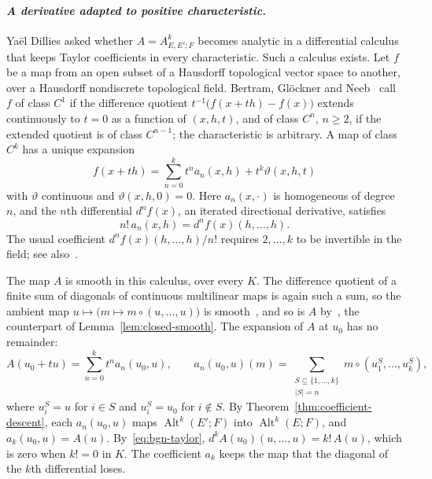 \documentclass[11pt]{amsart}
\theoremstyle{definition}
\theoremstyle{remark}
\numberwithin{equation}{section}
\newcommand{\Alt}{\operatorname{Alt}}
\newcommand{\abs}[1]{\lvert #1\rvert}
\begin{document}
\paragraph{\textit{A derivative adapted to positive characteristic.}}
Ya\"el Dillies asked whether $A=A^k_{E,E';F}$ becomes analytic in a differential calculus that keeps Taylor coefficients in every
characteristic. Such a calculus exists. Let $f$ be a map from an open subset of a Hausdorff topological vector space to
another, over a Hausdorff nondiscrete topological field. Bertram, Gl\"ockner and Neeb~\cite{BGN} call $f$ of class $C^1$
if the difference quotient $t^{-1}\bigl(f(x+th)-f(x)\bigr)$ extends continuously to $t=0$ as a function of $(x,h,t)$, and of
class $C^n$, $n\ge2$, if the extended quotient is of class $C^{n-1}$; the characteristic is arbitrary. A map of class $C^k$
has a unique expansion~\cite[Theorem~5.1]{BGN}
\[
 f(x+th)=\sum_{n=0}^{k}t^n a_n(x,h)+t^k\vartheta(x,h,t)
\]
with $\vartheta$ continuous and $\vartheta(x,h,0)=0$. Here $a_n(x,\cdot)$ is homogeneous of degree $n$, and the $n$th
differential $d^nf(x)$, an iterated directional derivative, satisfies~\cite[Definition~4.7 and Theorem~5.4]{BGN}
\begin{equation}\label{eq:bgn-taylor}
 n!\,a_n(x,h)=d^nf(x)(h,\ldots,h).
\end{equation}
The usual coefficient $d^nf(x)(h,\ldots,h)/n!$ requires $2,\ldots,k$ to be invertible in the field; see
also~\cite[Chapter~1]{Be}.

The map $A$ is smooth in this calculus, over every $K$. The difference quotient of a finite sum of diagonals of
continuous multilinear maps is again such a sum, so the ambient map $u\mapsto\bigl(m\mapsto m\circ(u,\ldots,u)\bigr)$ is
smooth~\cite[3.4 and Remark~4.2]{BGN}, and so is $A$ by~\cite[Lemma~10.1]{BGN}, the counterpart of
Lemma~\ref{lem:closed-smooth}. The expansion of $A$ at $u_0$ has no remainder:
\[
 A(u_0+tu)=\sum_{n=0}^{k}t^n a_n(u_0,u),\qquad
 a_n(u_0,u)(m)=\sum_{\substack{S\subseteq\{1,\ldots,k\}\\ \abs S=n}}m\circ(u^S_1,\ldots,u^S_k),
\]
where $u^S_i=u$ for $i\in S$ and $u^S_i=u_0$ for $i\notin S$. By Theorem~\ref{thm:coefficient-descent}, each
$a_n(u_0,u)$ maps $\Alt^k(E';F)$ into $\Alt^k(E;F)$, and $a_k(u_0,u)=A(u)$. By~\eqref{eq:bgn-taylor},
$d^kA(u_0)(u,\ldots,u)=k!\,A(u)$, which is zero when $k!=0$ in $K$. The coefficient $a_k$ keeps the map that the diagonal
of the $k$th differential loses.
\end{document}
